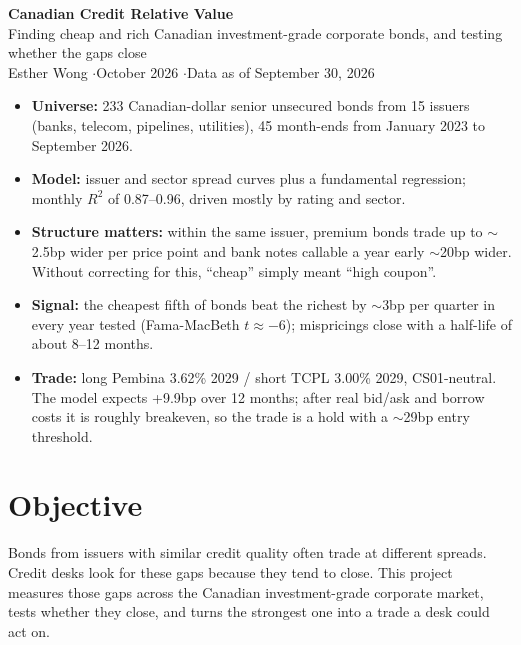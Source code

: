 \documentclass[11pt,letterpaper]{article}
\begin{document}
{\color{accent}\LARGE\bfseries Canadian Credit Relative Value}\\[4pt]
{\large Finding cheap and rich Canadian investment-grade corporate bonds, and testing whether the gaps close}\\[8pt]
{\small Esther Wong \quad$\cdot$\quad October 2026 \quad$\cdot$\quad Data as of September 30, 2026}

\vspace{6pt}
\begin{tcolorbox}[colback=accent!5,colframe=accent,boxrule=0.6pt,arc=2pt,title=\textbf{Key results},fonttitle=\small]
\small
\begin{itemize}[leftmargin=12pt]
  \item \textbf{Universe:} 233 Canadian-dollar senior unsecured bonds from 15 issuers (banks, telecom, pipelines, utilities), 45 month-ends from January 2023 to September 2026.
  \item \textbf{Model:} issuer and sector spread curves plus a fundamental regression; monthly $R^2$ of 0.87--0.96, driven mostly by rating and sector.
  \item \textbf{Structure matters:} within the same issuer, premium bonds trade up to $\sim$2.5bp wider per price point and bank notes callable a year early $\sim$20bp wider. Without correcting for this, ``cheap'' simply meant ``high coupon''.
  \item \textbf{Signal:} the cheapest fifth of bonds beat the richest by $\sim$3bp per quarter in every year tested (Fama-MacBeth $t \approx -6$); mispricings close with a half-life of about 8--12 months.
  \item \textbf{Trade:} long Pembina 3.62\% 2029 / short TCPL 3.00\% 2029, CS01-neutral. The model expects +9.9bp over 12 months; after real bid/ask and borrow costs it is roughly breakeven, so the trade is a hold with a $\sim$29bp entry threshold.
\end{itemize}
\end{tcolorbox}

\section{Objective}
Bonds from issuers with similar credit quality often trade at different spreads. Credit desks look for these gaps because they tend to close. This project measures those gaps across the Canadian investment-grade corporate market, tests whether they close, and turns the strongest one into a trade a desk could act on.
\end{document}
